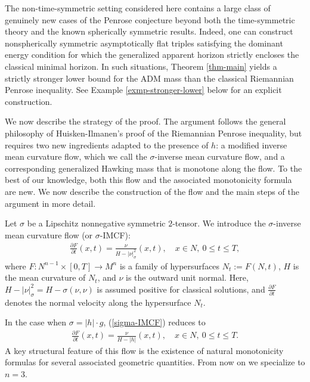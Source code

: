 \documentclass[11pt, letterpaper]{amsart}
\theoremstyle{definition}
\theoremstyle{remark}
\begin{document}
The non-time-symmetric setting considered here contains a large class of genuinely new cases of the Penrose conjecture beyond both the time-symmetric theory and the known spherically symmetric results. Indeed, one can construct nonspherically symmetric asymptotically flat triples satisfying the dominant energy condition for which the generalized apparent horizon strictly encloses the classical minimal horizon. In such situations, Theorem \ref{thm-main} yields a strictly stronger lower bound for the ADM mass than the classical Riemannian Penrose inequality. See Example \ref{exmp-stronger-lower} below for an explicit construction.
	



We now describe the strategy of the proof. The argument follows the general philosophy of Huisken-Ilmanen's proof of the Riemannian Penrose inequality, but requires two new ingredients adapted to the presence of $h$: a modified inverse mean curvature flow, which we call the $\sigma $-inverse mean curvature flow, and a corresponding generalized Hawking mass that is monotone along the flow. To the best of our knowledge, both this flow and the associated monotonicity formula are new. We now describe the construction of the flow and the main steps of the argument in more detail.



Let $\sigma $ be a Lipschitz nonnegative symmetric $2$-tensor. We introduce the $\sigma $-inverse mean curvature flow (or $\sigma $-IMCF):
\begin{align}\label{sigma-IMCF}
	\frac{\partial F}{\partial t} (x, t) = \frac{\nu }{H- |\nu |^2_{\sigma }}(x,t),\quad x \in N	,\  0 \leq t \leq T,
\end{align}
where $F: N ^{n-1} \times [0, T] \to M^{n}$ is a family of hypersurfaces $N_t := F(N, t)$, $H$ is the mean curvature of $N_t$, and $\nu $ is the outward unit normal. Here, $H- |\nu |^2_{\sigma }= H- \sigma (\nu , \nu )$ is assumed  positive for classical solutions, and $\frac{\partial F}{\partial t}$ denotes the normal velocity along the hypersurface $N_t$. 

In the case when $\sigma = |h|\cdot g$, (\ref{sigma-IMCF}) reduces to
\begin{align}\label{h-IMCF}
	\frac{\partial F}{\partial t}(x,t) = \frac{\nu }{H- |h|} (x,t), \quad x \in N,\  0 \leq t \leq T.
\end{align}
A key structural feature of this flow is the existence of natural monotonicity formulas for several associated geometric quantities. From now on we specialize to $n=3$. 
\end{document}
